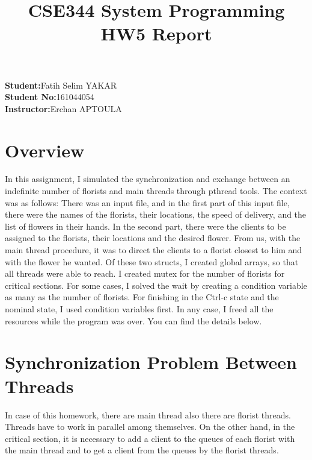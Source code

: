 \documentclass{article}
\title{\textbf{CSE344 System Programming HW5 Report}}
\begin{document}
\maketitle

\begin{center}
    \textbf{Student:}Fatih Selim YAKAR \\
    \textbf{Student No:}161044054 \\
    \textbf{Instructor:}Erchan APTOULA
\end{center}

\newpage

\section{Overview}
\par{In this assignment, I simulated the synchronization and exchange between an indefinite number of florists and main threads through pthread tools. The context was as follows: There was an input file, and in the first part of this input file, there were the names of the florists, their locations, the speed of delivery, and the list of flowers in their hands. In the second part, there were the clients to be assigned to the florists, their locations and the desired flower. From us, with the main thread procedure, it was to direct the clients to a florist closest to him and with the flower he wanted. Of these two structs, I created global arrays, so that all threads were able to reach. I created mutex for the number of florists for critical sections. For some cases, I solved the wait by creating a condition variable as many as the number of florists. For finishing in the Ctrl-c state and the nominal state, I used condition variables first. In any case, I freed all the resources while the program was over. You can find the details below.}

\section{Synchronization Problem Between Threads}
\par{In case of this homework, there are main thread also there are florist threads. Threads have to work in parallel among themselves. On the other hand, in the critical section, it is necessary to add a client to the queues of each florist with the main thread and to get a client from the queues by the florist threads.}

\end{document}
